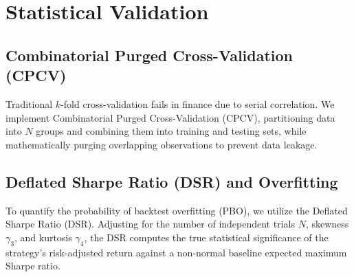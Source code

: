 \chapter{Statistical Validation}
\section{Combinatorial Purged Cross-Validation (CPCV)}
Traditional $k$-fold cross-validation fails in finance due to serial correlation. We implement Combinatorial Purged Cross-Validation (CPCV), partitioning data into $N$ groups and combining them into training and testing sets, while mathematically purging overlapping observations to prevent data leakage.
\section{Deflated Sharpe Ratio (DSR) and Overfitting}
To quantify the probability of backtest overfitting (PBO), we utilize the Deflated Sharpe Ratio (DSR). Adjusting for the number of independent trials $N$, skewness $\gamma_3$, and kurtosis $\gamma_4$, the DSR computes the true statistical significance of the strategy's risk-adjusted return against a non-normal baseline expected maximum Sharpe ratio.
